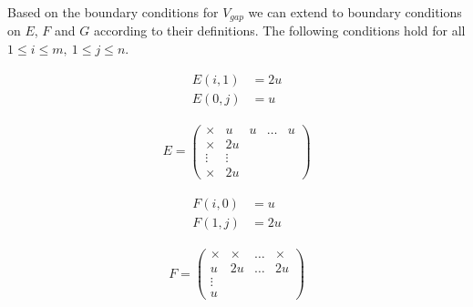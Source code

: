 \documentclass[a4paper]{article}
\begin{document}
Based on the boundary conditions for $V_{gap}$ we can extend to boundary conditions on $E$, $F$ and $G$ according to their definitions. The following conditions hold for all $1 \leq i \leq m,\ 1 \leq j \leq n$.
\begin{figure}[H]
    \centering
    \begin{minipage}{0.3\textwidth}
        \centering
        \begin{align*}
            E(i,1) &= 2u \\
            E(0,j) &= u
        \end{align*}
    \end{minipage}
    \begin{minipage}{0.3\textwidth}
        \centering
        \begin{align*}
            E = \begin{pmatrix}
                \times & u & u & \hdots & u \\
                \times & 2u \\
                \vdots & \vdots \\
                \times & 2u
            \end{pmatrix}
        \end{align*}
    \end{minipage}
\end{figure}
\begin{figure}[H]
    \centering
    \begin{minipage}{0.3\textwidth}
        \centering
        \begin{align*}
            F(i,0) &= u \\
            F(1,j) &= 2u
        \end{align*}
    \end{minipage}
    \begin{minipage}{0.3\textwidth}
        \centering
        \begin{align*}
            F = \begin{pmatrix}
                \times & \times & \hdots & \times \\
                u & 2u & \hdots & 2u \\
                \vdots \\
                u
            \end{pmatrix}
        \end{align*}
    \end{minipage}
\end{figure}
\end{document}

